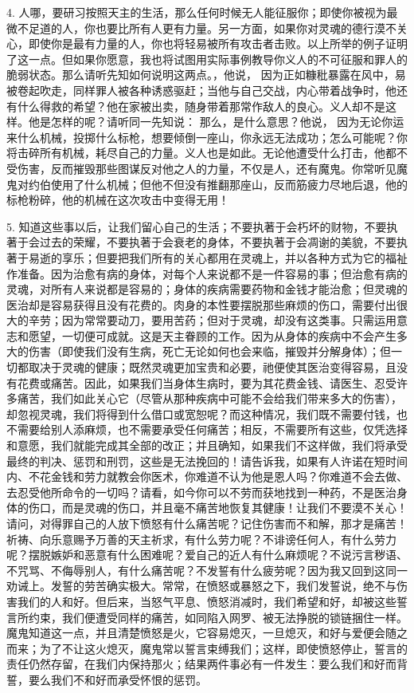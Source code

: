 4. 人哪，要研习按照天主的生活，那么任何时候无人能征服你；即使你被视为最微不足道的人，你也要比所有人更有力量。另一方面，如果你对灵魂的德行漠不关心，即使你是最有力量的人，你也将轻易被所有攻击者击败。以上所举的例子证明了这一点。但如果你愿意，我也将试图用实际事例教导你义人的不可征服和罪人的脆弱状态。那么请听先知如何说明这两点。，他说， 因为正如糠秕暴露在风中，易被卷起吹走，同样罪人被各种诱惑驱赶；当他与自己交战，内心带着战争时，他还有什么得救的希望？他在家被出卖，随身带着那常作敌人的良心。义人却不是这样。他是怎样的呢？请听同一先知说： 那么，是什么意思？他说， 因为无论你运来什么机械，投掷什么标枪，想要倾倒一座山，你永远无法成功；怎么可能呢？你将击碎所有机械，耗尽自己的力量。义人也是如此。无论他遭受什么打击，他都不受伤害，反而摧毁那些图谋反对他之人的力量，不仅是人，还有魔鬼。你常听见魔鬼对约伯使用了什么机械；但他不但没有推翻那座山，反而筋疲力尽地后退，他的标枪粉碎，他的机械在这次攻击中变得无用！\par

5. 知道这些事以后，让我们留心自己的生活；不要执著于会朽坏的财物，不要执著于会过去的荣耀，不要执著于会衰老的身体，不要执著于会凋谢的美貌，不要执著于易逝的享乐；但要把我们所有的关心都用在灵魂上，并以各种方式为它的福祉作准备。因为治愈有病的身体，对每个人来说都不是一件容易的事；但治愈有病的灵魂，对所有人来说都是容易的；身体的疾病需要药物和金钱才能治愈；但灵魂的医治却是容易获得且没有花费的。肉身的本性要摆脱那些麻烦的伤口，需要付出很大的辛劳；因为常常要动刀，要用苦药；但对于灵魂，却没有这类事。只需运用意志和愿望，一切便可成就。这是天主眷顾的工作。因为从身体的疾病中不会产生多大的伤害（即使我们没有生病，死亡无论如何也会来临，摧毁并分解身体）；但一切都取决于灵魂的健康；既然灵魂更加宝贵和必要，祂便使其医治变得容易，且没有花费或痛苦。因此，如果我们当身体生病时，要为其花费金钱、请医生、忍受许多痛苦，我们如此关心它（尽管从那种疾病中可能不会给我们带来多大的伤害），却忽视灵魂，我们将得到什么借口或宽恕呢？而这种情况，我们既不需要付钱，也不需要给别人添麻烦，也不需要承受任何痛苦；相反，不需要所有这些，仅凭选择和意愿，我们就能完成其全部的改正；并且确知，如果我们不这样做，我们将承受最终的判决、惩罚和刑罚，这些是无法挽回的！请告诉我，如果有人许诺在短时间内、不花金钱和劳力就教会你医术，你难道不认为他是恩人吗？你难道不会去做、去忍受他所命令的一切吗？请看，如今你可以不劳而获地找到一种药，不是医治身体的伤口，而是灵魂的伤口，并且毫不痛苦地恢复其健康！让我们不要漠不关心！请问，对得罪自己的人放下愤怒有什么痛苦呢？记住伤害而不和解，那才是痛苦！祈祷、向乐意赐予万善的天主祈求，有什么劳力呢？不诽谤任何人，有什么劳力呢？摆脱嫉妒和恶意有什么困难呢？爱自己的近人有什么麻烦呢？不说污言秽语、不咒骂、不侮辱别人，有什么痛苦呢？不发誓有什么疲劳呢？因为我又回到这同一劝诫上。发誓的劳苦确实极大。常常，在愤怒或暴怒之下，我们发誓说，绝不与伤害我们的人和好。但后来，当怒气平息、愤怒消减时，我们希望和好，却被这些誓言所约束，我们便遭受同样的痛苦，如同陷入网罗、被无法挣脱的锁链捆住一样。魔鬼知道这一点，并且清楚愤怒是火，它容易熄灭，一旦熄灭，和好与爱便会随之而来；为了不让这火熄灭，魔鬼常以誓言束缚我们；这样，即使愤怒停止，誓言的责任仍然存留，在我们内保持那火；结果两件事必有一件发生：要么我们和好而背誓，要么我们不和好而承受怀恨的惩罚。\par

